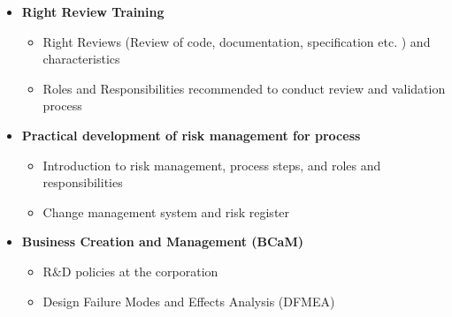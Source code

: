 \begin {itemize}
\begin {itemize}
\begin {itemize}
        \end {itemize}\vspace{0.3cm}
       \item [$\bullet$] \bf {\mtf \normalsize Right Review Training  } \mdseries
         \begin {itemize}
            \item [-] Right Reviews (Review of code, documentation, specification etc. ) and characteristics 
            \item [-] Roles and Responsibilities recommended to conduct review and validation process 
        \end {itemize}\vspace{0.3cm}
       \item [$\bullet$] \bf {\mtf \normalsize Practical development of risk management for process  } \mdseries
         \begin {itemize}
            \item [-] Introduction to risk management, process steps, and roles and responsibilities
            \item [-] Change management system and  risk register
        \end {itemize}\vspace{0.3cm}
            \item [$\bullet$] \bf {\mtf \normalsize Business Creation and Management (BCaM) } \mdseries
         \begin {itemize}
            \item [-] R$\&$D policies at the corporation
            \item [-] Design Failure Modes and Effects Analysis (DFMEA)
        \end {itemize}\vspace{0.3cm}
\end {itemize}
\end {itemize}
